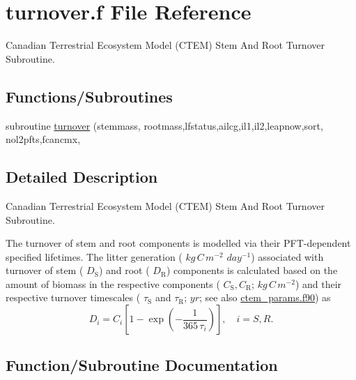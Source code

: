 \hypertarget{turnover_8f}{}\section{turnover.\+f File Reference}
\label{turnover_8f}


Canadian Terrestrial Ecosystem Model (C\+T\+E\+M) Stem And Root Turnover Subroutine.  


\subsection*{Functions/\+Subroutines}
\begin{DoxyCompactItemize}
\item 
subroutine \hyperlink{turnover_8f_adaaa94be49886167722ab507a931c4fe}{turnover} (stemmass, rootmass,lfstatus,ailcg,il1,il2,leapnow,sort, nol2pfts,fcancmx,
\end{DoxyCompactItemize}


\subsection{Detailed Description}
Canadian Terrestrial Ecosystem Model (C\+T\+E\+M) Stem And Root Turnover Subroutine. 

The turnover of stem and root components is modelled via their P\+F\+T-\/dependent specified lifetimes. The litter generation ( $kg\,C\,m^{-2}$ $day^{-1}$) associated with turnover of stem ( $D_\mathrm{S}$) and root ( $D_\mathrm{R}$) components is calculated based on the amount of biomass in the respective components ( $C_\mathrm{S}, C_\mathrm{R}$; $kg\,C\,m^{-2}$) and their respective turnover timescales ( $\tau_\mathrm{S}$ and $\tau_\mathrm{R}$; $yr$; see also \hyperlink{ctem__params_8f90}{ctem\+\_\+params.\+f90}) as \[ \label{citod} D_{i} = C_{i}\left[1 - \exp\left(-\frac{1}{365\,\tau_{i}}\right)\right],\quad i = S, R.\] 

\subsection{Function/\+Subroutine Documentation}
\hypertarget{turnover_8f_adaaa94be49886167722ab507a931c4fe}{}
